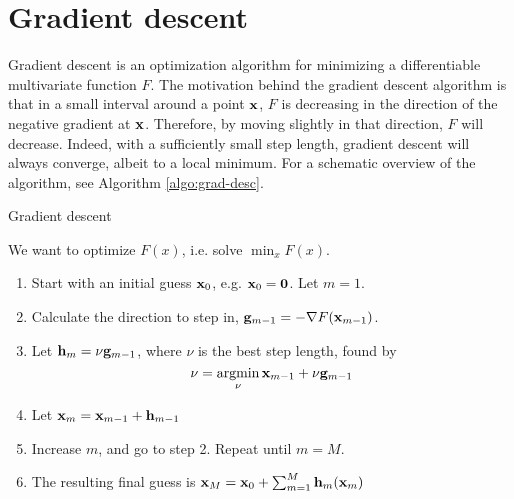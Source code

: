 \section{Gradient descent}
Gradient descent is an optimization algorithm for minimizing a differentiable multivariate function $F$. The motivation behind the gradient descent algorithm is that in a small interval around a point $\mathbf{x}$, $F$ is decreasing in the direction of the negative gradient at $\mathbf{x}$. Therefore, by moving slightly in that direction, $F$ will decrease. Indeed, with a sufficiently small step length, gradient descent will always converge, albeit to a local minimum. For a schematic overview of the algorithm, see Algorithm \ref{algo:grad-desc}.
\begin{algorithm}
\caption{Gradient descent}
\label{algo:grad-desc}
We want to optimize $F(x)$, i.e. solve $\min_{x}F(x)$.
\begin{enumerate}
    \item Start with an initial guess $\mathbf{x}_0$, e.g. $\mathbf{x}_0=\mathbf{0}$. Let $m=1$.
    \item Calculate the direction to step in, $\mathbf{g}_{m-1}=-\nabla F(\mathbf{x}_{m-1})$.
    \item Let $\mathbf{h}_m=\nu \mathbf{g}_{m-1}$, where $\nu$ is the best step length, found by
        \begin{equation*}
            \nu=\operatorname*{argmin}_{\nu}\mathbf{x}_{m-1}+\nu \mathbf{g}_{m-1}
        \end{equation*}
    \item Let $\mathbf{x}_m=\mathbf{x}_{m-1}+\mathbf{h}_{m-1}$
    \item Increase $m$, and go to step 2. Repeat until $m=M$.
    \item The resulting final guess is $\mathbf{x}_M=\mathbf{x}_0+\sum_{m=1}^M\mathbf{h}_m(\mathbf{x}_m)$
\end{enumerate}
\end{algorithm}

